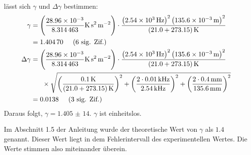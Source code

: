 	    lässt sich $\gamma$ und $\Delta \gamma$ bestimmen:
	    \begin{align}
	    	\gamma &= \left(\frac{\num{28,96e-3}}{\num{8.314463}}\si{\kelvin\second\squared\per\meter\squared}\right)\cdot\frac{\left(\SI{2,54e3}{\hertz}\right)^2\left(\SI{135.6e-3}{\meter}\right)^2}{\left(\num{21,0} + \num{273.15}\right)\si{\kelvin}} \notag \\
	    	&= \num{1,40470} \hspace{0.5cm}\text{(6 sig. Zif.)} \\
	    	\Delta\gamma &= \left(\frac{\num{28,96e-3}}{\num{8.314463}}\si{\kelvin\second\squared\per\meter\squared}\right)\cdot\frac{\left(\SI{2,54e3}{\hertz}\right)^2\left(\SI{135.6e-3}{\meter}\right)^2}{\left(\num{21,0} + \num{273.15}\right)\si{\kelvin}} \notag \\
	    	&~~~~~\times \sqrt{\left(\frac{\SI{0.1}{\kelvin}}{\left(\num{21,0} + \num{273.15}\right)\si{\kelvin}}\right)^2 + \left(\frac{2\cdot\SI{0,01}{\kilo\hertz}}{\SI{2,54}{\kilo\hertz}}\right)^2 + \left(\frac{2\cdot\SI{0,4}{\milli\meter}}{\SI{135.6}{\milli\meter}}\right)^2} \notag \\
	    	&= \num{0,0138} \hspace{0.5cm}\text{(3 sig. Zif.)}
		\end{align}
		Daraus folgt, $\gamma = \num{1,405(14)}$. $\gamma$ ist einheitslos.

		Im Abschnitt 1.5 der Anleitung wurde der theoretische Wert von $\gamma$ als $\num{1.4}$ genannt. Dieser Wert liegt in dem Fehlerintervall des experimentellen Wertes. Die Werte stimmen also miteinander überein.